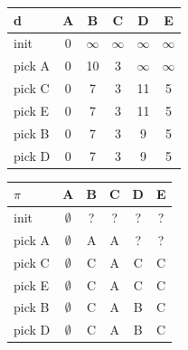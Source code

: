 \documentclass[a4paper, 10pt, twoside]{article}
\begin{document}
\begin{table}[!ht]
	\begin{minipage}{.5\textwidth}
		\centering
		\begin{tabular}{l|ccccc}
			d      & A & B        & C        & D        & E        \\
			\hline
			init & 0 & $\infty$ & $\infty$ & $\infty$ & $\infty$ \\
			pick A & 0 & 10 & 3 & $\infty$ & $\infty$ \\
			pick C & 0 & 7 & 3 & 11 & 5 \\
			pick E & 0 & 7 & 3 & 11 & 5 \\
			pick B & 0 & 7 & 3 & 9 & 5 \\
			pick D & 0 & 7 & 3 & 9 & 5 \\
		\end{tabular}
	\end{minipage}
	\begin{minipage}{.49\textwidth}
		\centering
		\begin{tabular}{l|ccccc}
			$\pi$      & A & B        & C        & D        & E        \\
			\hline
			init & $\emptyset$ & ? & ? & ? & ? \\
			pick A & $\emptyset$ & A & A & ? & ? \\
			pick C & $\emptyset$ & C & A & C & C \\
			pick E & $\emptyset$ & C & A & C & C \\
			pick B & $\emptyset$ & C & A & B & C \\
			pick D & $\emptyset$ & C & A & B & C \\
		\end{tabular}
	\end{minipage}
\end{table}
\end{document}
